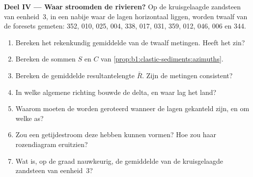\begin{problem}
\medskip
\noindent\textbf{Deel IV --- Waar stroomden de rivieren?}
Op de kruisgelaagde zandsteen van eenheid~3, in een nabije  waar de
lagen horizontaal liggen, worden twaalf  van de foresets
gemeten: 352, 010, 025, 004, 338, 017, 031, 359, 012, 046, 006 en 344.
\begin{enumerate}[resume]
  \item Bereken het rekenkundig gemiddelde van de twaalf metingen. Heeft het zin?
  \item Bereken de sommen $S$ en $C$ van \cref{prop:b1:clastic-sediments:azimuths}.
  \item Bereken de gemiddelde resultantelengte $\bar R$. Zijn de metingen
        consistent?
  \item In welke algemene richting bouwde de delta, en waar lag het land?
  \item Waarom moeten de  worden geroteerd wanneer de lagen
        gekanteld zijn, en om welke as?
  \item Zou een getijdestroom deze  hebben kunnen vormen? Hoe zou haar
        rozendiagram eruitzien?
  \item Wat is, op de graad nauwkeurig, de gemiddelde  van de
        kruisgelaagde zandsteen van eenheid~3?
\end{enumerate}
\end{problem}
